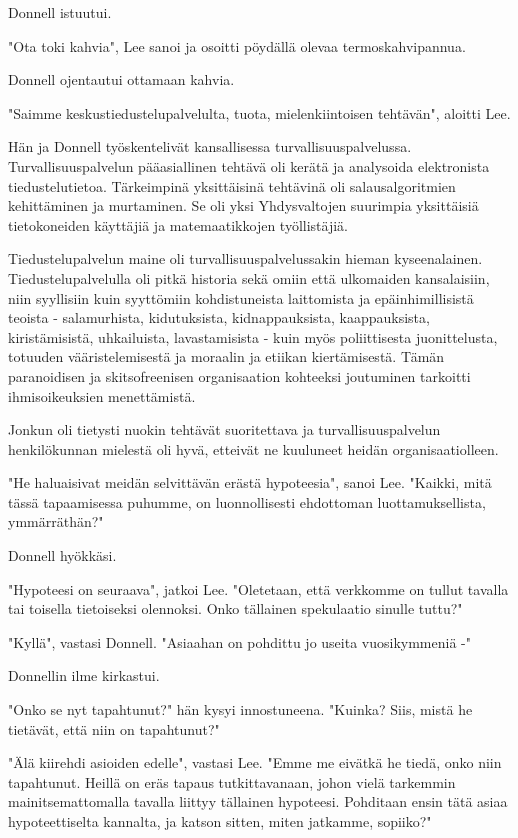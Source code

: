 Donnell istuutui.


"Ota toki kahvia", Lee sanoi ja osoitti pöydällä olevaa termoskahvipannua.


Donnell ojentautui ottamaan kahvia.


"Saimme keskustiedustelupalvelulta, tuota, mielenkiintoisen tehtävän", aloitti Lee.


Hän ja Donnell työskentelivät kansallisessa turvallisuuspalvelussa. Turvallisuuspalvelun pääasiallinen tehtävä oli kerätä ja analysoida elektronista tiedustelutietoa. Tärkeimpinä yksittäisinä tehtävinä oli salausalgoritmien kehittäminen ja murtaminen. Se oli yksi Yhdysvaltojen suurimpia yksittäisiä tietokoneiden käyttäjiä ja matemaatikkojen työllistäjiä.


Tiedustelupalvelun maine oli turvallisuuspalvelussakin hieman kyseenalainen. Tiedustelupalvelulla oli pitkä historia sekä omiin että ulkomaiden kansalaisiin, niin syyllisiin kuin syyttömiin kohdistuneista laittomista ja epäinhimillisistä teoista - salamurhista, kidutuksista, kidnappauksista, kaappauksista, kiristämisistä, uhkailuista, lavastamisista - kuin myös poliittisesta juonittelusta, totuuden vääristelemisestä ja moraalin ja etiikan kiertämisestä. Tämän paranoidisen ja skitsofreenisen organisaation kohteeksi joutuminen tarkoitti ihmisoikeuksien menettämistä.


Jonkun oli tietysti nuokin tehtävät suoritettava ja turvallisuuspalvelun henkilökunnan mielestä oli hyvä, etteivät ne kuuluneet heidän organisaatiolleen.


"He haluaisivat meidän selvittävän erästä hypoteesia", sanoi Lee. "Kaikki, mitä tässä tapaamisessa puhumme, on luonnollisesti ehdottoman luottamuksellista, ymmärräthän?"


Donnell hyökkäsi.


"Hypoteesi on seuraava", jatkoi Lee. "Oletetaan, että verkkomme on tullut tavalla tai toisella tietoiseksi olennoksi. Onko tällainen spekulaatio sinulle tuttu?"


"Kyllä", vastasi Donnell. "Asiaahan on pohdittu jo useita vuosikymmeniä -"


Donnellin ilme kirkastui.


"Onko se nyt tapahtunut?" hän kysyi innostuneena. "Kuinka? Siis, mistä he tietävät, että niin on tapahtunut?"


"Älä kiirehdi asioiden edelle", vastasi Lee. "Emme me eivätkä he tiedä, onko niin tapahtunut. Heillä on eräs tapaus tutkittavanaan, johon vielä tarkemmin mainitsemattomalla tavalla liittyy tällainen hypoteesi. Pohditaan ensin tätä asiaa hypoteettiselta kannalta, ja katson sitten, miten jatkamme, sopiiko?"


